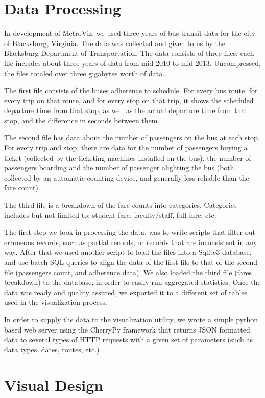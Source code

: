 \documentclass[journal]{vgtc}                %
\begin{document}
\section{Data Processing}

In development of MetroViz, we used three years of bus transit data for the city of Blacksburg, Virginia. The data was collected and given to us by the Blacksburg Department of Transportation. The data consists of three files; each file includes about three years of data from mid 2010 to mid 2013. Uncompressed, the files totaled over three gigabytes worth of data.

The first file consists of the buses adherence to schedule. For every bus route, for every trip on that route, and for every stop on that trip, it shows the scheduled departure time from that stop, as well as the actual departure time from that stop, and the difference in seconds between them

The second file has data about the number of passengers on the bus at each stop. For every trip and stop, there are data for the number of passengers buying a ticket (collected by the ticketing machines installed on the bus), the number of passengers boarding and the number of passenger alighting the bus (both collected by an automatic counting device, and generally less reliable than the fare count).

The third file is a breakdown of the fare counts into categories. Categories includes but not limited to: student fare, faculty/staff, full fare, etc.

The first step we took in processing the data, was to write scripts that filter out erroneous records, such as partial records, or records that are inconsistent in any way. After that we used another script to load the files into a Sqlite3 database, and use batch SQL queries to align the data of the first file to that of the second file (passengers count, and adherence data). We also loaded the third file (fares breakdown) to the database, in order to easily run aggregated statistics. Once the data was ready and quality assured, we exported it to a different set of tables used in the visualization process.

In order to supply the data to the visualization utility, we wrote a simple python based web server using the CherryPy framework that returns JSON formatted data to several types of HTTP requests with a given set of parameters (such as data types, dates, routes, etc.)

\section{Visual Design}
\end{document}
